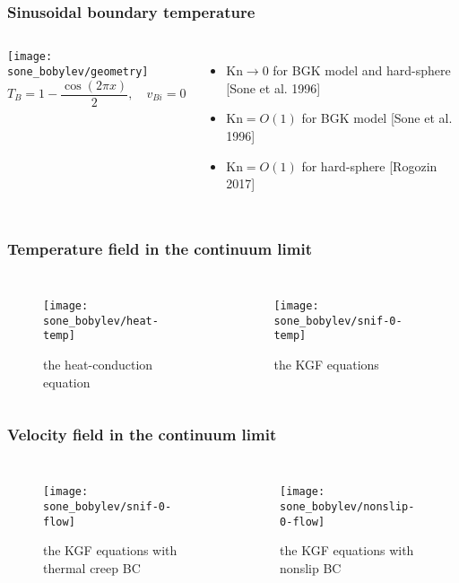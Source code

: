 \documentclass[mathserif]{beamer} %
\newcommand{\Kn}{\mathrm{Kn}}
\newcommand{\OO}[1]{O(#1)}
\begin{document}
\begin{frame}
    \frametitle{Sinusoidal boundary temperature}
    \begin{columns}
        \hspace{-10pt}\texttt{[image: sone\_bobylev/geometry]}
        \[ T_B = 1 - \frac{\cos(2\pi x)}{2}, \quad v_{Bi} = 0 \]
        \begin{itemize}
            \item \(\Kn\to0\) for BGK model and hard-sphere [Sone et al. 1996]
            \smallskip
            \item \(\Kn=\OO{1}\) for BGK model [Sone et al. 1996]
            \smallskip
            \item \(\Kn=\OO{1}\) for hard-sphere [Rogozin 2017]
        \end{itemize}
    \end{columns}
\end{frame}

\begin{frame}
    \frametitle{Temperature field in the continuum limit}
    \begin{columns}
        \begin{figure}
            \texttt{[image: sone\_bobylev/heat-temp]}
            \caption{the heat-conduction equation}
        \end{figure}
        \begin{figure}
            \texttt{[image: sone\_bobylev/snif-0-temp]}
            \caption{the KGF equations}
        \end{figure}
    \end{columns}
\end{frame}

\begin{frame}
    \frametitle{Velocity field in the continuum limit}
    \begin{columns}
        \begin{figure}
            \texttt{[image: sone\_bobylev/snif-0-flow]}
            \caption{the KGF equations with thermal creep BC}
        \end{figure}
        \begin{figure}
            \texttt{[image: sone\_bobylev/nonslip-0-flow]}
            \caption{the KGF equations with nonslip BC}
        \end{figure}
    \end{columns}
\end{frame}
\end{document}
